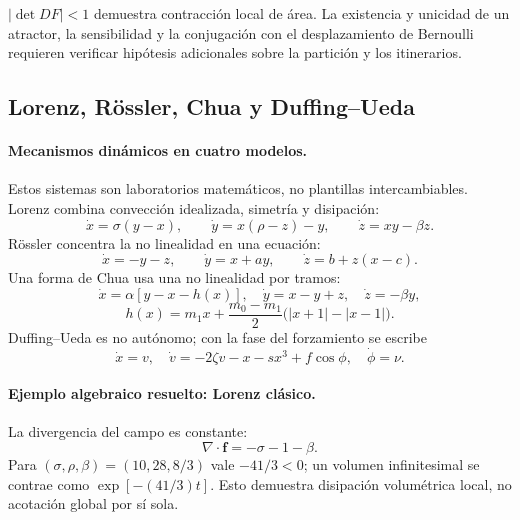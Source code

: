 \begin{warningbox}
\(|\det DF|<1\) demuestra contracción local de área. La existencia y unicidad de un
atractor, la sensibilidad y la conjugación con el desplazamiento de Bernoulli requieren verificar hipótesis adicionales sobre la partición y los itinerarios.
\end{warningbox}


\subsection{Lorenz, Rössler, Chua y Duffing--Ueda}

\paragraph{Mecanismos dinámicos en cuatro modelos.}
Estos sistemas son laboratorios matemáticos, no plantillas intercambiables. Lorenz
combina convección idealizada, simetría y disipación:
\[
 \dot x=\sigma(y-x),\qquad
 \dot y=x(\rho-z)-y,\qquad
 \dot z=xy-\beta z.
\]
Rössler concentra la no linealidad en una ecuación:
\[
 \dot x=-y-z,\qquad
 \dot y=x+ay,\qquad
 \dot z=b+z(x-c).
\]
Una forma de Chua usa una no linealidad por tramos:
\[
 \dot x=\alpha[y-x-h(x)],\quad
 \dot y=x-y+z,\quad
 \dot z=-\beta y,
\]
\[
 h(x)=m_1x+\frac{m_0-m_1}{2}
 \bigl(|x+1|-|x-1|\bigr).
\]
Duffing--Ueda es no autónomo; con la fase del forzamiento se escribe
\[
 \dot x=v,\quad
 \dot v=-2\zeta v-x-sx^3+f\cos\phi,\quad
 \dot\phi=\nu.
\]

\paragraph{Ejemplo algebraico resuelto: Lorenz clásico.}
La divergencia del campo es constante:
\[
 \nabla\cdot\mathbf f=-\sigma-1-\beta.
\]
Para \((\sigma,\rho,\beta)=(10,28,8/3)\) vale \(-41/3<0\); un volumen infinitesimal
se contrae como \(\exp[-(41/3)t]\). Esto demuestra disipación volumétrica local, no
acotación global por sí sola.

